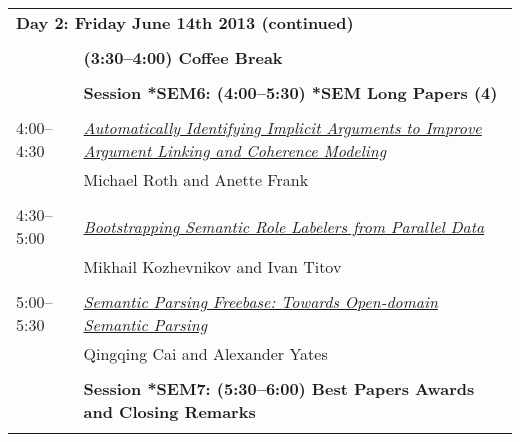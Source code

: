 \newpage
\begin{tabular}{p{20mm}p{138mm}}
\\
\multicolumn{2}{l}{\bf Day 2: Friday June 14th 2013 (continued)} \\\\
 & {\bf (3:30--4:00) Coffee Break} \\
\\
 & {\bf Session *SEM6: (4:00--5:30) *SEM Long Papers (4)} \\
\\
4:00--4:30 & \hyperlink{page.306}{\em Automatically Identifying Implicit Arguments to Improve Argument Linking and Coherence Modeling}\\
         & Michael Roth and Anette Frank \\
\\

4:30--5:00 & \hyperlink{page.317}{\em Bootstrapping Semantic Role Labelers from Parallel Data}\\
         & Mikhail Kozhevnikov and Ivan Titov \\
\\

5:00--5:30 & \hyperlink{page.328}{\em Semantic Parsing Freebase: Towards Open-domain Semantic Parsing}\\
         & Qingqing Cai and Alexander Yates \\
\\

 & {\bf Session *SEM7: (5:30--6:00) Best Papers Awards and Closing Remarks} \\
\\


\end{tabular}

